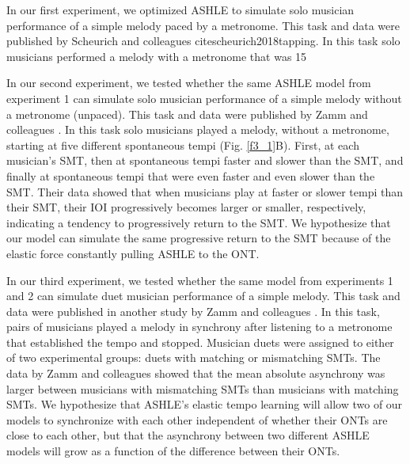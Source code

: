 \documentclass{report}
\begin{document}
In our first experiment, we optimized ASHLE to simulate solo musician performance of a simple melody paced by a metronome. This task and data were published by Scheurich and colleagues cite{scheurich2018tapping}. In this task solo musicians performed a melody with a metronome that was 15%

In our second experiment, we tested whether the same ASHLE model from experiment 1 can simulate solo musician performance of a simple melody without a metronome (unpaced). This task and data were published by Zamm and colleagues \cite{zamm2018musicians}. In this task solo musicians played a melody, without a metronome, starting at five different spontaneous tempi (Fig.{} \ref{f3_1}B). First, at each musician's SMT, then at spontaneous tempi faster and slower than the SMT, and finally at spontaneous tempi that were even faster and even slower than the SMT. Their data showed that when musicians play at faster or slower tempi than their SMT, their IOI progressively becomes larger or smaller, respectively, indicating a tendency to progressively return to the SMT. We hypothesize that our model can simulate the same progressive return to the SMT because of the elastic force constantly pulling ASHLE to the ONT. 

In our third experiment, we tested whether the same model from experiments 1 and 2 can simulate duet musician performance of a simple melody. This task and data were published in another study by Zamm and colleagues \cite{zamm2016endogenous}. In this task, pairs of musicians played a melody in synchrony after listening to a metronome that established the tempo and stopped. Musician duets were assigned to either of two experimental groups: duets with matching or mismatching SMTs. The data by Zamm and colleagues \cite{zamm2016endogenous} showed that the mean absolute asynchrony was larger between musicians with mismatching SMTs than musicians with matching SMTs. We hypothesize that ASHLE's elastic tempo learning will allow two of our models to synchronize with each other independent of whether their ONTs are close to each other, but that the asynchrony between two different ASHLE models will grow as a function of the difference between their ONTs.
\end{document}
